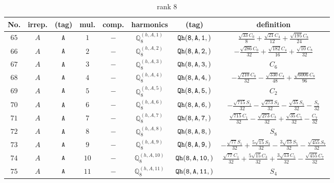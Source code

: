 \documentclass[fleqn,8pt]{jsarticle}
\begin{document}
\begin{table}[ht!]
\begin{center}
\caption{rank 8}
\renewcommand{\arraystretch}{1.3}
\begin{tabular}{cccccccc} \hline \hline
No. & irrep. & (tag) & mul. & comp. & harmonics & (tag) & definition \\ \hline
$ 65 $ & $ A $ & $ {\tt A} $ & $ 1 $ & $ - $ & $ \mathbb{Q}_{8}^{(h,A,1)} $ & $ {\tt Qh(8,A,1,)} $ & $ \frac{\sqrt{33} C_{0}}{8} + \frac{\sqrt{21} C_{4}}{12} + \frac{\sqrt{195} C_{8}}{24} $ \\
$ 66 $ & $ A $ & $ {\tt A} $ & $ 2 $ & $ - $ & $ \mathbb{Q}_{8}^{(h,A,2)} $ & $ {\tt Qh(8,A,2,)} $ & $ - \frac{\sqrt{286} C_{0}}{32} + \frac{\sqrt{182} C_{4}}{16} + \frac{\sqrt{10} C_{8}}{32} $ \\
$ 67 $ & $ A $ & $ {\tt A} $ & $ 3 $ & $ - $ & $ \mathbb{Q}_{8}^{(h,A,3)} $ & $ {\tt Qh(8,A,3,)} $ & $ C_{6} $ \\
$ 68 $ & $ A $ & $ {\tt A} $ & $ 4 $ & $ - $ & $ \mathbb{Q}_{8}^{(h,A,4)} $ & $ {\tt Qh(8,A,4,)} $ & $ - \frac{\sqrt{210} C_{0}}{32} - \frac{\sqrt{330} C_{4}}{48} + \frac{\sqrt{6006} C_{8}}{96} $ \\
$ 69 $ & $ A $ & $ {\tt A} $ & $ 5 $ & $ - $ & $ \mathbb{Q}_{8}^{(h,A,5)} $ & $ {\tt Qh(8,A,5,)} $ & $ C_{2} $ \\
$ 70 $ & $ A $ & $ {\tt A} $ & $ 6 $ & $ - $ & $ \mathbb{Q}_{8}^{(h,A,6)} $ & $ {\tt Qh(8,A,6,)} $ & $ - \frac{\sqrt{715} S_{1}}{32} - \frac{\sqrt{273} S_{3}}{32} - \frac{\sqrt{35} S_{5}}{32} - \frac{S_{7}}{32} $ \\
$ 71 $ & $ A $ & $ {\tt A} $ & $ 7 $ & $ - $ & $ \mathbb{Q}_{8}^{(h,A,7)} $ & $ {\tt Qh(8,A,7,)} $ & $ \frac{\sqrt{715} C_{1}}{32} - \frac{\sqrt{273} C_{3}}{32} + \frac{\sqrt{35} C_{5}}{32} - \frac{C_{7}}{32} $ \\
$ 72 $ & $ A $ & $ {\tt A} $ & $ 8 $ & $ - $ & $ \mathbb{Q}_{8}^{(h,A,8)} $ & $ {\tt Qh(8,A,8,)} $ & $ S_{8} $ \\
$ 73 $ & $ A $ & $ {\tt A} $ & $ 9 $ & $ - $ & $ \mathbb{Q}_{8}^{(h,A,9)} $ & $ {\tt Qh(8,A,9,)} $ & $ - \frac{\sqrt{77} S_{1}}{32} + \frac{5 \sqrt{15} S_{3}}{32} - \frac{3 \sqrt{13} S_{5}}{32} - \frac{\sqrt{455} S_{7}}{32} $ \\
$ 74 $ & $ A $ & $ {\tt A} $ & $ 10 $ & $ - $ & $ \mathbb{Q}_{8}^{(h,A,10)} $ & $ {\tt Qh(8,A,10,)} $ & $ \frac{\sqrt{77} C_{1}}{32} + \frac{5 \sqrt{15} C_{3}}{32} + \frac{3 \sqrt{13} C_{5}}{32} - \frac{\sqrt{455} C_{7}}{32} $ \\
$ 75 $ & $ A $ & $ {\tt A} $ & $ 11 $ & $ - $ & $ \mathbb{Q}_{8}^{(h,A,11)} $ & $ {\tt Qh(8,A,11,)} $ & $ S_{4} $ \\

\end{tabular}
\end{center}
\end{table}
\end{document}
